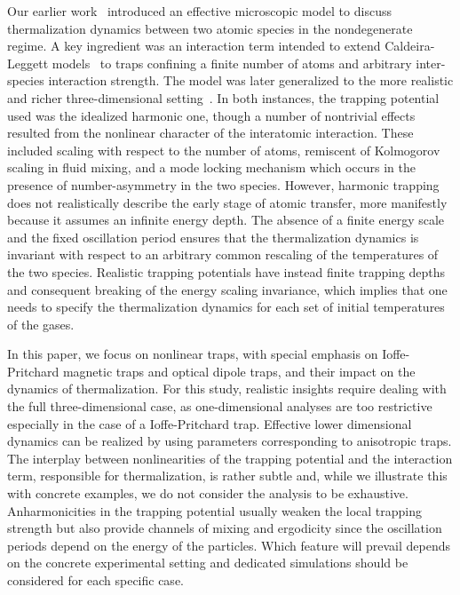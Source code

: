 \documentclass[pra,letterpaper,onecolumn,superscriptaddress,floatfix]{revtex4}
\begin{document}
Our earlier work~\cite{OnoSun} introduced an effective microscopic model to discuss thermalization dynamics 
between two atomic species in the nondegenerate regime. A key ingredient was an interaction term intended to
extend Caldeira-Leggett models~\cite{Magalinskii,Ullersma1,Ullersma2,Ullersma3,Ullersma4,Caldeira1,Caldeira2,Caldeira3} 
to traps confining a finite number of atoms and arbitrary inter-species interaction strength. 
The model was later generalized to the more realistic and richer three-dimensional setting~\cite{JauOnoSun}. 
In both instances, the trapping potential used was the idealized harmonic one, though a number of nontrivial 
effects resulted from the nonlinear character of the interatomic interaction. 
These included scaling with respect to the number of atoms, remiscent of Kolmogorov scaling in fluid mixing, and
a mode locking mechanism which occurs in the presence of number-asymmetry in the two species.
However, harmonic trapping does not realistically describe the early stage of atomic transfer, more 
manifestly because it assumes an infinite energy depth. The absence of a finite energy scale and the fixed 
oscillation period ensures that the thermalization dynamics is invariant with respect to an arbitrary 
common rescaling of the temperatures of the two species. Realistic trapping potentials have instead finite 
trapping depths and consequent breaking of the energy scaling invariance, which implies that one needs to specify
the thermalization dynamics for each set of initial temperatures of the gases. 

In this paper, we focus on nonlinear traps, with special emphasis on Ioffe-Pritchard 
magnetic traps and optical dipole traps, and their impact on the dynamics of thermalization. 
For this study, realistic insights require dealing with the full three-dimensional case, as 
one-dimensional analyses are too restrictive especially in the case of a Ioffe-Pritchard trap. 
Effective lower dimensional dynamics can be realized by using parameters corresponding to anisotropic traps.
The interplay between nonlinearities of the trapping potential and the interaction term, responsible for thermalization, 
is rather subtle and, while we illustrate this with concrete examples, we do not consider the analysis to be exhaustive. 
Anharmonicities in the trapping potential usually weaken the local trapping strength but also provide channels 
of mixing and ergodicity since the oscillation periods depend on the energy of the particles. 
Which feature will prevail depends on the concrete experimental setting and dedicated 
simulations should be considered for each specific case. 
\end{document}
